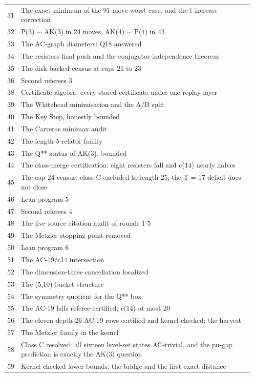 \documentclass[11pt,a4paper]{article}
\theoremstyle{definition}
\begin{document}
\begin{longtable}{rp{}}
31 & The exact minimum of the 91-move worst case, and the l-increase correction \\
32 & P(3) $\sim$ AK(3) in 24 moves, AK(4) $\sim$ P(4) in 43 \\
33 & The AC-graph diameters: Q18 answered \\
34 & The resisters final push and the conjugator-independence theorem \\
35 & The disk-backed census at caps 21 to 23 \\
36 & Second referees 3 \\
38 & Certificate algebra: every stored certificate under one replay layer \\
39 & The Whitehead minimisation and the A/B split \\
40 & The Key Step, honestly bounded \\
41 & The Carreras minimax audit \\
42 & The length-5-relator family \\
43 & The Q** status of AK(3), bounded \\
44 & The class-merge certification: eight resisters fall and c(14) nearly halves \\
45 & The cap-24 census; class C excluded to length 25; the T = 17 deficit does not close \\
46 & Lean program 5 \\
47 & Second referees 4 \\
48 & The live-source citation audit of rounds 1-5 \\
49 & The Metzler stopping point removed \\
50 & Lean program 6 \\
51 & The AC-19/c14 intersection \\
52 & The dimension-three cancellation localized \\
53 & The (5,10)-bucket structure \\
54 & The symmetry quotient for the Q** box \\
55 & The AC-19 falls referee-certified; c(14) at most 20 \\
56 & The eleven depth-26 AC-19 rows certified and kernel-checked; the harvest \\
57 & The Metzler family in the kernel \\
58 & Class C resolved: all sixteen level-set states AC-trivial, and the pu-gap prediction is exactly the AK(3) question \\
59 & Kernel-checked lower bounds: the bridge and the first exact distance \\

\end{longtable}
\end{document}
